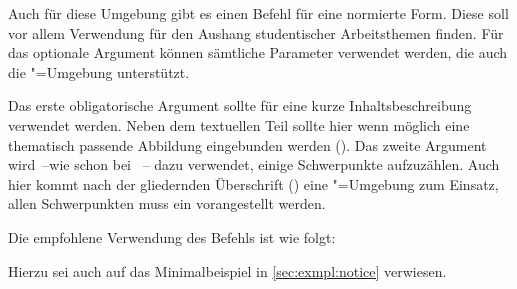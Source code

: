 \begin{Declaration}{\LParameter%
}
\printdeclarationlist%
%
Auch für diese Umgebung gibt es einen Befehl für eine normierte Form. Diese 
soll vor allem Verwendung für den Aushang studentischer Arbeitsthemen finden. 
Für das optionale Argument können sämtliche Parameter verwendet werden, die 
auch die "=Umgebung unterstützt.

Das erste obligatorische Argument sollte für eine kurze Inhaltsbeschreibung 
verwendet werden. Neben dem textuellen Teil sollte hier wenn möglich eine 
thematisch passende Abbildung eingebunden werden (). Das 
zweite Argument wird~--wie schon bei ~-- dazu verwendet, einige 
Schwerpunkte aufzuzählen. Auch hier kommt nach der gliedernden Überschrift 
() eine "=Umgebung zum Einsatz, allen 
Schwerpunkten muss ein  vorangestellt werden.
%
\end{Declaration}
%
\begin{Example}
Die empfohlene Verwendung des Befehls  ist wie folgt:
\begin{Code}[escapechar=§]
}{%
  \item Schwerpunkt 1
  \item Schwerpunkt 2
}
\end{Code}
Hierzu sei auch auf das Minimalbeispiel in \autoref{sec:exmpl:notice} verwiesen.
\end{Example}

